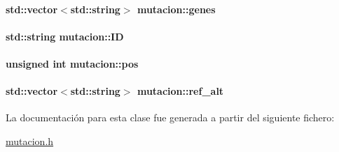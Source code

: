 \paragraph[{\texorpdfstring{genes}{genes}}]{\setlength{\rightskip}{0pt plus 5cm}std\+::vector$<$std\+::string$>$ mutacion\+::genes\hspace{0.3cm}{\ttfamily [private]}}\hypertarget{classmutacion_a40212ce0822ff41c32ac82156094af69}{}\label{classmutacion_a40212ce0822ff41c32ac82156094af69}
\paragraph[{\texorpdfstring{ID}{ID}}]{\setlength{\rightskip}{0pt plus 5cm}std\+::string mutacion\+::\+ID\hspace{0.3cm}{\ttfamily [private]}}\hypertarget{classmutacion_a963e5d258723e4d25f9a3b4c8ec99f2a}{}\label{classmutacion_a963e5d258723e4d25f9a3b4c8ec99f2a}
\paragraph[{\texorpdfstring{pos}{pos}}]{\setlength{\rightskip}{0pt plus 5cm}unsigned int mutacion\+::pos\hspace{0.3cm}{\ttfamily [private]}}\hypertarget{classmutacion_ae1487b8648d0eaad68de5e4e5a87f3ff}{}\label{classmutacion_ae1487b8648d0eaad68de5e4e5a87f3ff}
\paragraph[{\texorpdfstring{ref\+\_\+alt}{ref_alt}}]{\setlength{\rightskip}{0pt plus 5cm}std\+::vector$<$std\+::string$>$ mutacion\+::ref\+\_\+alt\hspace{0.3cm}{\ttfamily [private]}}\hypertarget{classmutacion_a79091ce22a92f1994070a37916304d55}{}\label{classmutacion_a79091ce22a92f1994070a37916304d55}


La documentación para esta clase fue generada a partir del siguiente fichero\+:\begin{DoxyCompactItemize}
\item 
\hyperlink{mutacion_8h}{mutacion.\+h}\end{DoxyCompactItemize}
